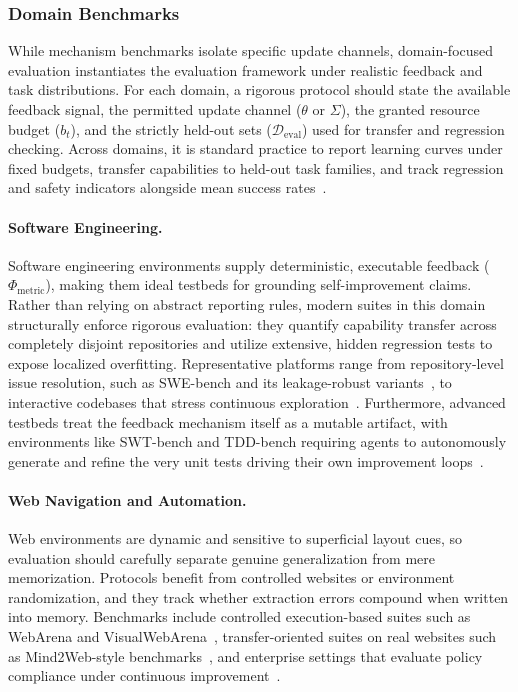 \subsubsection{Domain Benchmarks}
\label{sec:Domain_Benchmarks}
While mechanism benchmarks isolate specific update channels, domain-focused  evaluation instantiates the evaluation framework under realistic feedback and task distributions. For each domain, a rigorous protocol should state the available feedback signal, the permitted update channel ($\theta$ or $\Sigma$), the granted resource budget ($b_t$), and the strictly held-out sets ($\mathcal{D}_{\text{eval}}$) used for transfer and regression checking. Across domains, it is standard practice to report learning curves under fixed budgets, transfer capabilities to held-out task families, and track regression and safety indicators alongside mean success rates~\citep{xi2024agentgym, levy2025stwebagentbenchbenchmarkevaluatingsafety, yin2025safeagentbenchbenchmarksafetask}.

\paragraph{Software Engineering.}
Software engineering environments  supply deterministic, executable feedback ($\Phi_{\text{metric}}$), making them ideal testbeds for grounding self-improvement claims. Rather than relying on abstract reporting rules, modern suites in this domain structurally enforce rigorous evaluation: they quantify capability transfer across completely disjoint repositories and utilize extensive, hidden regression tests to expose localized overfitting. Representative platforms range from repository-level issue resolution, such as SWE-bench and its leakage-robust variants~\citep{jimenez2024swebenchlanguagemodelsresolve, aleithan2024swebenchenhancedcodingbenchmark}, to interactive codebases that stress continuous exploration~\citep{qiu2025locobenchagentinteractivebenchmarkllm}. Furthermore, advanced testbeds treat the feedback mechanism itself as a mutable artifact, with environments like SWT-bench and TDD-bench requiring agents to autonomously generate and refine the very unit tests driving their own improvement loops~\citep{mündler2025swtbenchtestingvalidatingrealworld, ahmed2024tddbenchverifiedllmsgenerate}.


\paragraph{Web Navigation and Automation.}
Web environments are dynamic and sensitive to superficial layout cues, so evaluation should carefully separate genuine generalization from mere memorization. Protocols benefit from controlled websites or environment randomization, and they  track whether extraction errors compound when written into memory. Benchmarks include controlled execution-based suites such as WebArena and VisualWebArena~\citep{zhou2024webarena, koh2024visualwebarenaevaluatingmultimodalagents}, transfer-oriented suites on real websites such as Mind2Web-style benchmarks~\citep{deng2023mindweb, pan2024webcanvas}, and enterprise settings that evaluate policy compliance under continuous improvement~\citep{levy2025stwebagentbenchbenchmarkevaluatingsafety}.

